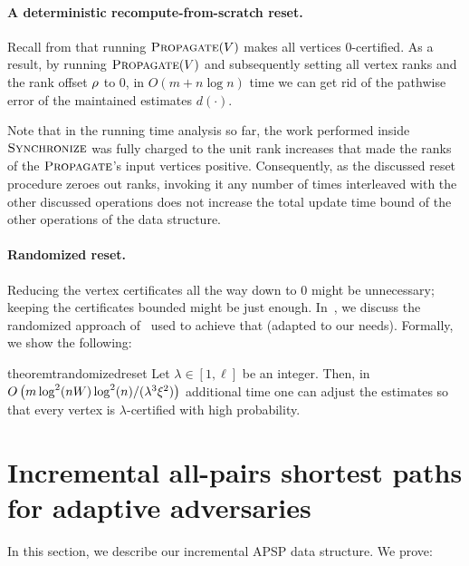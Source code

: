 \documentclass[11pt,letterpaper]{article}
\theoremstyle{plain}
\renewcommand{\O}{O}
\DeclareMathOperator*{\PD}{\textsc{Propagate}}
\begin{document}
\paragraph{A deterministic recompute-from-scratch reset.}
Recall from  that running \linebreak $\PD(V)$ makes all vertices $0$-certified.
As a result, by running $\PD(V)$ and subsequently setting all vertex ranks
and the rank offset $\rho$ to $0$, in $\O(m+n\log{n})$ time we can get rid of
the pathwise error of the maintained estimates $d(\cdot)$.

Note that in the running time analysis so far, the work performed
inside $\textsc{Synchronize}$ was fully charged to the unit rank increases that made the ranks of the $\PD$'s input vertices positive.
Consequently, as the discussed reset procedure zeroes out ranks, invoking it any number of times interleaved with
the other discussed operations does not increase
the total update time bound of the other operations of the data structure.

\paragraph{Randomized reset.}
Reducing the vertex certificates all the way down to $0$ might be unnecessary; keeping the certificates
bounded might be just enough.
In~, we discuss the randomized approach of~\cite{ChechikZ21} used to achieve that (adapted to our needs).
Formally, we show the following:

\newcommand{\bal}{\lambda}

\begin{restatable}{theorem}{trandomizedreset}\label{t:randomized-reset}
Let $\bal\in [1,\ell]$ be an integer. Then, in $\O\left(m\log^2(nW)\log^2(n)/(\bal^3\epsp^2)\right)$ additional time
one can adjust the estimates so that every vertex is $\lambda$-certified with high probability.
\end{restatable}

\section{Incremental all-pairs shortest paths for adaptive adversaries}\label{sec:all-pairs}
In this section, we describe our incremental APSP data structure. We prove:
\tallpairs*

\newcommand{\Vcur}{V_{\mathrm{cur}}}
\newcommand{\Ecur}{E_{\mathrm{cur}}}
\newcommand{\Gbeg}{G_{\mathrm{beg}}}
\newcommand{\batchds}{\mathcal{B}}
\newcommand{\dsfrom}{\mathcal{D}}
\newcommand{\dsto}{\mathcal{D}^{R}}
\newcommand{\apsp}{\mathcal{A}}
\newcommand{\Gto}{G^{\mathrm{to}}}
\newcommand{\Gfrom}{G^{\mathrm{from}}}
\newcommand{\phlen}{b}
\newcommand{\reset}{p}
\end{document}
